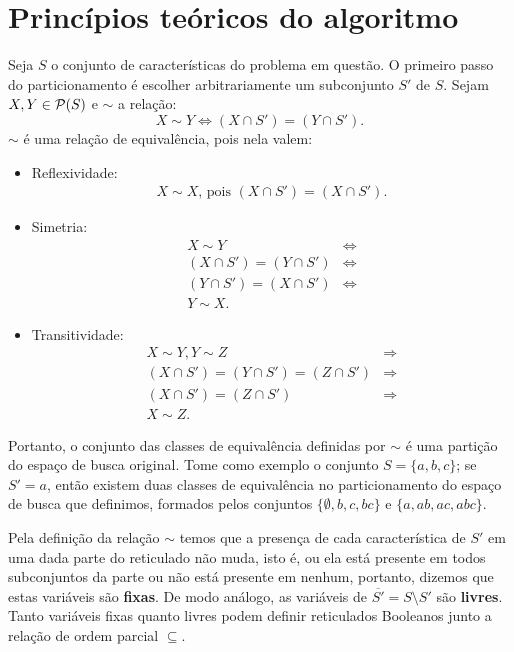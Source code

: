 \section{Princípios teóricos do algoritmo}\label{sec:pucs_principles}
Seja $S$ o conjunto de características do problema em questão. O 
primeiro passo do particionamento é escolher arbitrariamente um 
subconjunto $S'$ de $S$. Sejam $X, Y \in \mathcal{P} (S)$
e $\sim$ a relação:
\begin{equation*}
    X \sim Y \iff (X \cap S') = (Y \cap S').
\end{equation*}
$\sim$ é uma relação de equivalência, pois nela valem:
\begin{itemize}
    \item{Reflexividade:}
        \begin{align*} 
            X \sim X \text{, pois }
            (X \cap S') = (X \cap S').
        \end{align*} 
    \item{Simetria:}
        \begin{align*}
            X \sim Y  & \iff \\
            (X \cap S') = (Y \cap S') & \iff \\
            (Y \cap S') = (X \cap S') & \iff \\
            Y \sim X. 
        \end{align*}
    \item{Transitividade:}
        \begin{align*}
            X \sim Y, Y \sim Z & \Rightarrow \\
            (X \cap S') = (Y \cap S') = (Z \cap S') & \Rightarrow \\
            (X \cap S') = (Z \cap S') & \Rightarrow \\
            X \sim Z.
        \end{align*}
\end{itemize}
Portanto, o conjunto das classes de equivalência definidas por $\sim$ é
uma partição do espaço de busca original. Tome como exemplo o conjunto
$S = \{a, b, c\}$; se $S' = {a}$, então existem duas classes de 
equivalência no particionamento do espaço de busca que definimos, 
formados pelos conjuntos $\{\emptyset, b, c, bc\}$ e $\{a, ab, ac, 
abc\}$.

Pela definição da relação $\sim$ temos que a presença de cada 
característica de $S'$ em uma dada parte do reticulado não muda, isto é,
ou ela está presente em todos subconjuntos da parte ou não está presente
em nenhum, portanto, dizemos que estas variáveis são {\bf fixas}. De 
modo análogo, as variáveis de $\overline{S'} = S \setminus S'$ são {\bf livres}. Tanto 
variáveis fixas quanto livres podem definir reticulados Booleanos junto 
a relação de ordem parcial $\subseteq$.

